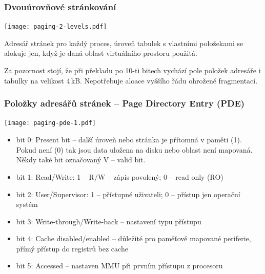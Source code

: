 \documentclass{beamer}
\begin{document}
\begin{frame}
\frametitle{Dvouúrovňové stránkování}

{
\centering

\texttt{[image: paging-2-levels.pdf]}

}

Adresář stránek pro každý proces, úroveň tabulek s vlastními položekami
se alokuje jen, když je daná oblast virtuálního prostoru použitá.

Za pozornost stojí, že při překladu po 10-ti bitech vychází pole položek
adresáře i tabulky na velikost 4\,kB. Nepotřebuje aloace vyššího řádu
ohrožené fragmentací.

\end{frame}

\begin{frame}
\frametitle{Položky adresářů stránek -- \textbf{Page Directory Entry} (PDE) }

{
\centering

\texttt{[image: paging-pde-1.pdf]}

}

\vskip 2mm

\begin{itemize}
\item bit 0: Present bit -- další úroveň nebo stránka je přítomná v paměti (1). Pokud není (0) tak jsou data uložena na disku nebo oblast není mapovaná. Někdy také bit označovaný V -- valid bit.
\item bit 1: Read/Write: 1 -- R/W -- zápis povolený; 0 -- read only (RO)
\item bit 2: User/Supervisor: 1 -- přístupné uživateli; 0 -- přístup jen operační systém
\item bit 3: Write-through/Write-back -- nastavení typu přístupu
\item bit 4: Cache disabled/enabled -- důležité pro paměťově mapované periferie, přímý přístup do registrů bez cache
\item bit 5: Accessed -- nastaven MMU při prvním přístupu z procesoru
\end{itemize}

\end{frame}
\end{document}
